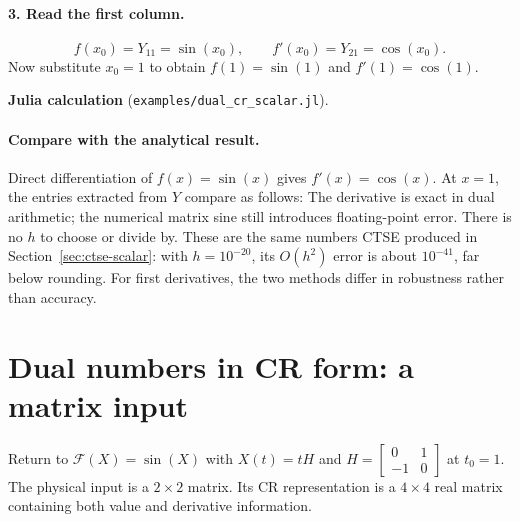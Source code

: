 \documentclass[11pt]{article}
\newcommand{\juliascript}[1]{\par\medskip\needspace{6\baselineskip}\noindent
  \textbf{Julia calculation} (\nolinkurl{examples/#1}).\par
  }
\begin{document}
\paragraph{3. Read the first column.}
\[
 \boxed{f(x_0)=Y_{11}=\sin(x_0),\qquad f'(x_0)=Y_{21}=\cos(x_0).}
\]
Now substitute $x_0=1$ to obtain $f(1)=\sin(1)$ and $f'(1)=\cos(1)$.

\juliascript{dual_cr_scalar.jl}
\paragraph{Compare with the analytical result.}
Direct differentiation of $f(x)=\sin(x)$ gives $f'(x)=\cos(x)$.
At $x=1$, the entries extracted from $Y$ compare as follows:
%
The derivative is exact in dual arithmetic; the numerical matrix sine
still introduces floating-point error. There is no $h$ to choose or divide by.
These are the same numbers CTSE produced in Section~\ref{sec:ctse-scalar}:
with $h=10^{-20}$, its $O(h^2)$ error is about $10^{-41}$, far below rounding.
For first derivatives, the two methods differ in robustness rather than
accuracy.

\section{Dual numbers in CR form: a matrix input}\label{sec:cr-matrix}
Return to $\mathcal F(X)=\sin(X)$ with $X(t)=tH$ and
$H=\left[\begin{smallmatrix}0&1\\-1&0\end{smallmatrix}\right]$ at $t_0=1$.
The physical input is a $2\times2$ matrix. Its CR representation is a
$4\times4$ real matrix containing both value and derivative information.
\end{document}
